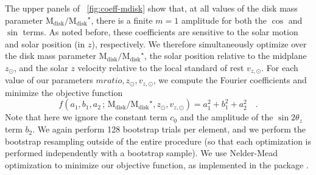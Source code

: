 \documentclass[modern]{aastex63}
\newcommand{\mdisk}{\ensuremath{\mathrm{M}_\mathrm{disk}}}
\newcommand{\mratio}{\ensuremath{\mdisk / \mdisk^\star}}
\begin{document}
The upper panels of \figurename~\ref{fig:coeff-mdisk} show that, at all values
of the disk mass parameter \mratio, there is a finite $m=1$ amplitude for both
the $\cos$ and $\sin$ terms.
As noted before, these coefficients are sensitive to the solar motion and solar
position (in $z$), respectively.
We therefore simultaneously optimize over the disk mass parameter \mratio, the
solar position relative to the midplane $z_\odot$, and the solar $z$ velocity
relative to the local standard of rest $v_{z, \odot}$.
For each value of our parameters $mratio, z_\odot, v_{z, \odot}$, we compute the
Fourier coefficients and minimize the objective function
\begin{equation}
  f(a_1, b_1, a_2 \,;\, \mratio, z_\odot, v_{z, \odot}) =
    a_1^2 + b_1^2 + a_2^2 \quad . \label{eq:objective}
\end{equation}
Note that here we ignore the constant term $c_0$ and the amplitude of the $\sin
2\theta_z$ term $b_2$.
We again perform 128 bootstrap trials per element, and we perform the bootstrap
resampling outside of the entire procedure (so that each optimization is
performed independently with a bootstrap sample).
We use Nelder-Mead optimization \citep{Gao:2012} to minimize our objective
function, as implemented in the  package \citep{scipy}.
\end{document}
